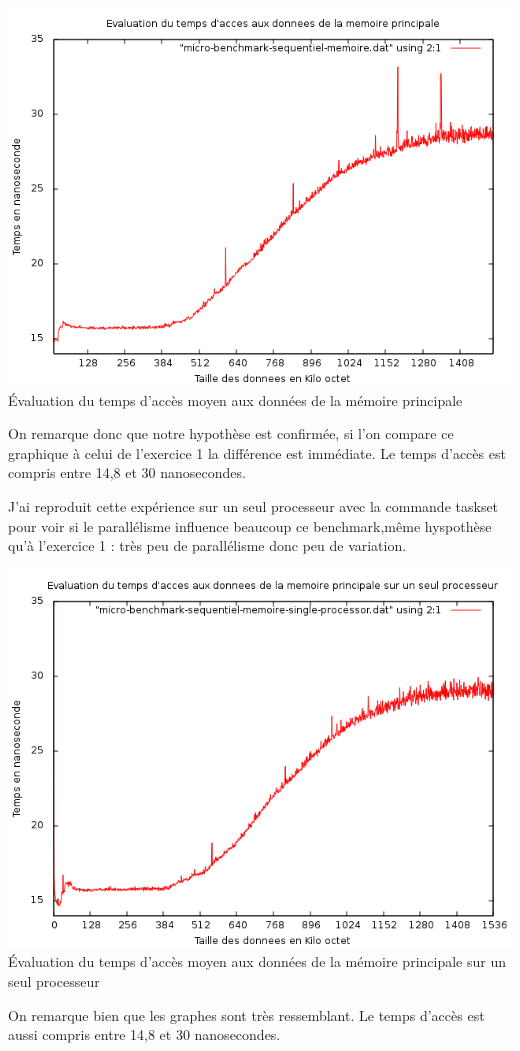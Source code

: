 \documentclass[11pt,a4paper]{article}
\begin{document}
\begin{center}
\includegraphics[keepaspectratio=true,width=\linewidth]{Exercice2/micro-benchmark-sequentiel-memoire.png}
 {Évaluation du temps d'accès moyen aux données de la mémoire principale}
\end{center}
On remarque donc que notre hypothèse est confirmée, si l'on compare ce graphique à celui de l'exercice 1 la différence est immédiate. Le temps d'accès est compris entre 14,8 et 30 nanosecondes.

J'ai reproduit cette expérience sur un seul processeur avec la commande taskset pour voir si le parallélisme influence beaucoup ce benchmark,même hyspothèse qu'à l'exercice 1 : très peu de parallélisme donc peu de variation.\\
\begin{center}
\includegraphics[keepaspectratio=true,width=\linewidth]{Exercice2/micro-benchmark-sequentiel-memoire-single-processor.png}
 {Évaluation du temps d'accès moyen aux données de la mémoire principale sur un seul processeur}
\end{center}
On remarque bien que les graphes sont très ressemblant. Le temps d'accès est aussi compris entre 14,8 et 30 nanosecondes.
\pagebreak
\end{document}
